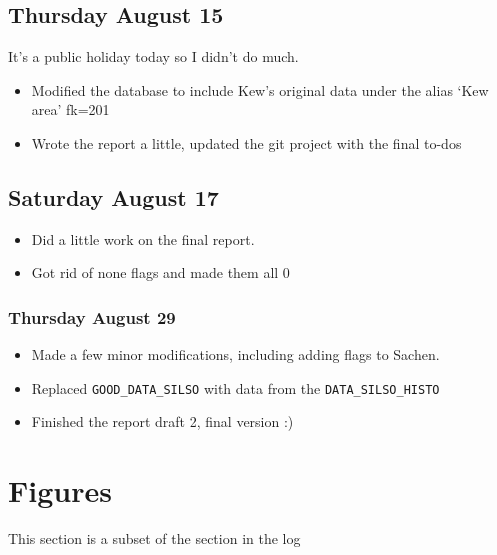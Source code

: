 \documentclass[12pt]{article}
\begin{document}
\subsection{Thursday August 15}
It's a public holiday today so I didn't do much.
\begin{itemize}
    \item Modified the database to include Kew's original data under the alias `Kew area' fk=201
    \item Wrote the report a little, updated the git project with the final to-dos
\end{itemize}

\subsection{Saturday August 17}
\begin{itemize}
    \item Did a little work on the final report.
    \item Got rid of none flags and made them all 0
\end{itemize}

\subsubsection{Thursday August 29}
\begin{itemize}
    \item Made a few minor modifications, including adding flags to Sachen.
    \item Replaced \texttt{GOOD\_DATA\_SILSO} with data from the \texttt{DATA\_SILSO\_HISTO}
    \item Finished the report draft 2, final version :)
\end{itemize}





\newpage





\section{Figures}
This section is a subset of the section in the log
\end{document}
